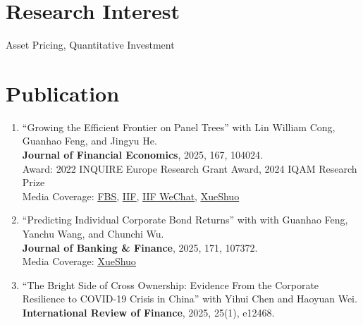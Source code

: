 \documentclass{clean_cv}
\begin{document}
\section{Research Interest}
\begin{center}
	Asset Pricing, Quantitative Investment
\end{center}

\section{Publication}

\begin{enumerate}
	\setlength\itemsep{1.0em}
	

	\item “Growing the Efficient Frontier on Panel Trees” 
		with Lin William Cong, Guanhao Feng, and Jingyu He. \\
		\textbf{Journal of Financial Economics}, 2025, 167, 104024. 
		\\
		Award:
			2022 INQUIRE Europe Research Grant Award,
			2024 IQAM Research Prize 
			\\
		Media Coverage: 
			\href{https://mp.weixin.qq.com/s/ePnIBXRj2YE-RSQkoWZTNw}{\underline{FBS}}, 
			\href{https://iif.ustc.edu.cn/2025/0220/c19557a674300/page.htm}{\underline{IIF}}, 
			\href{https://mp.weixin.qq.com/s/rUE0shWHWTzA0EEig2ImCA}{\underline{IIF WeChat}}, 
			\href{https://mp.weixin.qq.com/s/_hwltnHmtVf8iTVh62LhBQ}{\underline{XueShuo}} 
		
	\item “Predicting Individual Corporate Bond Returns” 
		with with Guanhao Feng, Yanchu Wang, and Chunchi Wu. \\
		\textbf{Journal of Banking \& Finance}, 2025, 171, 107372. \\
		Media Coverage: 
			\href{https://mp.weixin.qq.com/s/_hwltnHmtVf8iTVh62LhBQ}{\underline{XueShuo}}
			
	\item “The Bright Side of Cross Ownership: Evidence From the Corporate Resilience to COVID-19 Crisis in China” 
		with Yihui Chen and Haoyuan Wei. \\
		\textbf{International Review of Finance}, 2025, 25(1), e12468.
	
\end{enumerate}
\end{document}
